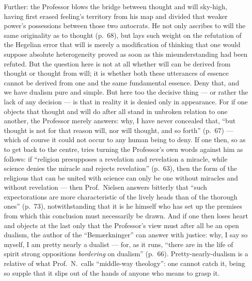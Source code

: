\documentclass[12pt,a4paper]{book}
\newcommand{\opage}[1]{\marginnote{\footnotesize\textit{[#1]}}}
\begin{document}
Further: the Professor blows the bridge between thought and will sky-high,
having first erased feeling's territory from his map and divided that weaker
power's possessions between those two autocrats. He not only ascribes to will
the same originality as to thought (p.\ 68), but lays such weight on the
refutation of the Hegelian error that will is merely a modification of thinking
that one would suppose absolute heterogeneity proved as soon as this
misunderstanding had been refuted. But the question here is not at all whether
will can be derived from thought or thought from will; it is whether both these
utterances of essence cannot be derived from one and the same fundamental
essence. Deny that, and we have dualism pure and simple. But here too the
decisive thing --- or rather the lack of any decision --- is that in reality it
is denied only in appearance. For if one objects that thought and will do after
all stand in unbroken relation to one another, the Professor merely answers:
why, I have never concealed that, ``but thought is not for that reason will,
nor will thought, and so forth'' (p.\ 67) --- which of course it could not
occur to any
\opage{60}human being to deny. If one then, so as to get back to the centre,
tries turning the Professor's own words against him as follows: if ``religion
presupposes a revelation and revelation a miracle, while science denies the
miracle and rejects revelation'' (p.\ 63), then the form of the religious that
can be united with science can only be one without miracles and without
revelation --- then Prof.\ Nielsen answers bitterly that ``such expectorations
are more characteristic of the lively heads than of the thorough ones'' (p.\
73), notwithstanding that it is he himself who has set up the premises from
which this conclusion must necessarily be drawn. And if one then loses heart
and objects at the last only that the Professor's view must after all be an
open dualism, the author of the ``Bemærkninger'' can answer with justice: why,
I say so myself, I am pretty nearly a dualist --- for, as it runs, ``there are
in the life of spirit strong oppositions \emph{bordering} on dualism'' (p.\
66). Pretty-nearly-dualism is a relative of what Prof.\ N.\ calls
``middle-way theology'': one cannot catch it, being so supple that it slips out
of the hands of anyone who means to grasp it.
\end{document}
